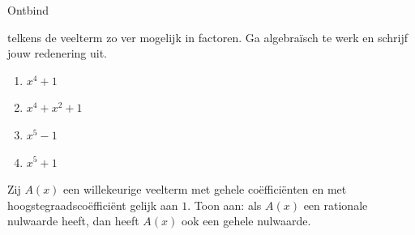 \documentclass{ximera}
\begin{document}

\begin{Oefening}\setcounter{enumi}{11} 
\hypertarget{oef4.11}{Ontbind} telkens de veelterm zo ver mogelijk in factoren. Ga algebra\"isch te werk en schrijf jouw redenering uit.  
\begin{multicols}{2}
\begin{enumerate}

\item
$x^4+1$
\item
$x^4 + x^2 + 1$
\item
$x^5-1$
\item
$x^5+1$
\end{enumerate}
\end{multicols}
\end{Oefening}

\begin{Oefening}
Zij $A(x)$ een willekeurige veelterm met gehele co\"effici\"enten en met hoogstegraadsco\"effici\"ent gelijk aan $1$. Toon aan: als $A(x)$ een rationale nulwaarde heeft, dan heeft $A(x)$ ook een gehele nulwaarde.
\end{Oefening}
\end{document}
